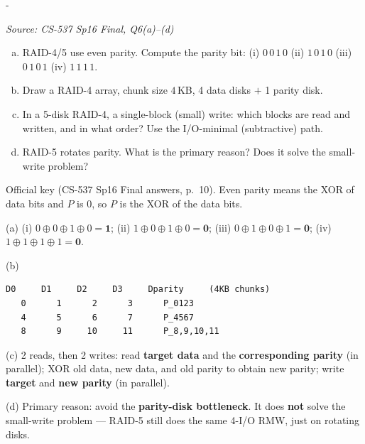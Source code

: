 \documentclass[11pt,a4paper]{article}
\makeatletter
\newcommand{\keepspace}[1]{\par\penalty-100\begingroup
  \setlength{\dimen@}{#1}\dimen@ii\pagegoal\advance\dimen@ii-\pagetotal
  \ifdim\dimen@>\dimen@ii\ifdim\dimen@ii>\z@\vfil\fi\break\fi\endgroup}
\newcounter{qn}[section]
\newenvironment{Qn}[4]{%
  \refstepcounter{qn}\keepspace{7\baselineskip}%
  \begin{tcolorbox}[qboxstyle, title={Q\thesection.\theqn\ \ [#1 \textbar\ #2]\ \ #4}]%
  {\footnotesize\color{g3}\textit{Source: #3}}\par\smallskip%
}{%
  \end{tcolorbox}%
}
\newenvironment{Sol}{%
  \begin{tcolorbox}[sboxstyle, title={Solution}]%
}{%
  \end{tcolorbox}\vspace{0.35em}%
}
\makeatother
\begin{document}
\begin{Qn}{Medium-Hard}{Lect 22A}{CS-537 Sp16 Final, Q6(a)--(d)}{Even parity, RAID-4 map, small write, RAID-5 rotation}
\begin{enumerate}[(a)]
\item RAID-4/5 use even parity. Compute the parity bit:
      (i) $0\,0\,1\,0$\quad
      (ii) $1\,0\,1\,0$\quad
      (iii) $0\,1\,0\,1$\quad
      (iv) $1\,1\,1\,1$.
\item Draw a RAID-4 array, chunk size $4$\,KB, 4 data disks $+$ 1 parity
      disk.
\item In a 5-disk RAID-4, a single-block (small) write: which blocks
      are read and written, and in what order? Use the I/O-minimal
      (subtractive) path.
\item RAID-5 rotates parity. What is the primary reason? Does it solve
      the small-write problem?
\end{enumerate}
\end{Qn}
\begin{Sol}
Official key (CS-537 Sp16 Final answers, p.~10). Even parity means the
XOR of data bits and $P$ is $0$, so $P$ is the XOR of the data bits.

(a) (i) $0\oplus 0\oplus 1\oplus 0 = \mathbf{1}$;
(ii) $1\oplus 0\oplus 1\oplus 0 = \mathbf{0}$;
(iii) $0\oplus 1\oplus 0\oplus 1 = \mathbf{0}$;
(iv) $1\oplus 1\oplus 1\oplus 1 = \mathbf{0}$.

(b)
\begin{lstlisting}[numbers=none]
  D0     D1     D2     D3     Dparity     (4KB chunks)
   0      1      2      3      P_0123
   4      5      6      7      P_4567
   8      9     10     11      P_8,9,10,11
\end{lstlisting}

(c) 2 reads, then 2 writes: read \textbf{target data} and the
\textbf{corresponding parity} (in parallel); XOR old data, new data,
and old parity to obtain new parity; write \textbf{target} and
\textbf{new parity} (in parallel).

(d) Primary reason: avoid the \textbf{parity-disk bottleneck}. It does
\textbf{not} solve the small-write problem --- RAID-5 still does the
same 4-I/O RMW, just on rotating disks.
\end{Sol}
\end{document}
